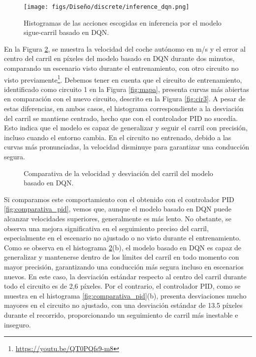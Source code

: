 \begin{figure}[ht]
\centering
\texttt{[image: figs/Diseño/discrete/inference\_dqn.png]}
\caption{Histogramas de las acciones escogidas en inferencia por el modelo sigue-carril basado en \ac{DQN}.}
\label{fig:inference_dqn}
\end{figure}

En la Figura \ref{fig:comparativa_dqn}, se muestra la velocidad del coche autónomo en m/s y el error al centro del carril en píxeles del modelo basado en \ac{DQN} durante dos minutos, comparando un escenario visto durante el entrenamiento\footnotemark[3], con otro circuito no visto previamente\footnote{\url{https://youtu.be/QT0PQfs9-m8}}. Debemos tener en cuenta que el circuito de entrenamiento, identificado como circuito 1 en la Figura \ref{fig:mapa}, presenta curvas más abiertas en comparación con el nuevo circuito, descrito en la Figura \ref{fig:cir3}. A pesar de estas diferencias, en ambos casos, el histograma correspondiente a la desviación del carril se mantiene centrado, hecho que con el controlador \ac{PID} no sucedía. Esto indica que el modelo es capaz de generalizar y seguir el carril con precisión, incluso cuando el entorno cambia. En el circuito no entrenado, debido a las curvas más pronunciadas, la velocidad disminuye para garantizar una conducción segura.

\begin{figure}[ht]
\centering
{}
\hfill
{}
\caption{Comparativa de la velocidad y desviación del carril del modelo basado en \ac{DQN}.}
\label{fig:comparativa_dqn}
\end{figure}
\newpage

Si comparamos este comportamiento con el obtenido con el controlador \ac{PID} \ref{fig:comparativa_pid}, vemos que, aunque el modelo basado en \ac{DQN} puede alcanzar velocidades superiores, generalmente es más lento. No obstante, se observa una mejora significativa en el seguimiento preciso del carril, especialmente en el escenario no ajustado o no visto durante el entrenamiento. Como se observa en el histograma \ref{fig:comparativa_dqn}(b), el modelo basado en \ac{DQN} es capaz de generalizar y mantenerse dentro de los límites del carril en todo momento con mayor precisión, garantizando una conducción más segura incluso en escenarios nuevos. En este caso, la desviación estándar respecto al centro del carril durante todo el circuito es de 2,6 píxeles. Por el contrario, el controlador \ac{PID}, como se muestra en el histograma \ref{fig:comparativa_pid}(b), presenta desviaciones mucho mayores en el circuito no ajustado, con una desviación estándar de 13.5 píxeles durante el recorrido, proporcionando un seguimiento de carril más inestable e inseguro.

